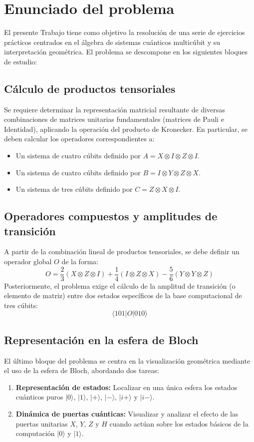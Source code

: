 \documentclass[11pt,a4paper,spanish]{book}
\begin{document}
\chapter{Enunciado del problema}

El presente Trabajo tiene como objetivo la resolución de una serie de ejercicios prácticos centrados en el álgebra de sistemas cuánticos multicúbit y su interpretación geométrica. El problema se descompone en los siguientes bloques de estudio:

\section{Cálculo de productos tensoriales}
Se requiere determinar la representación matricial resultante de diversas combinaciones de matrices unitarias fundamentales (matrices de Pauli e Identidad), aplicando la operación del producto de Kronecker. En particular, se deben calcular los operadores correspondientes a:
\begin{itemize}
    \item Un sistema de cuatro cúbits definido por $A = X \otimes I \otimes Z \otimes I$.
    \item Un sistema de cuatro cúbits definido por $B = I \otimes Y \otimes Z \otimes X$.
    \item Un sistema de tres cúbits definido por $C = Z \otimes X \otimes I$.
\end{itemize}

\section{Operadores compuestos y amplitudes de transición}
A partir de la combinación lineal de productos tensoriales, se debe definir un operador global $O$ de la forma:
\[ O = \frac{2}{3}(X \otimes Z \otimes I) + \frac{1}{4}(I \otimes Z \otimes X) - \frac{5}{6}(Y \otimes Y \otimes Z) \]
Posteriormente, el problema exige el cálculo de la amplitud de transición (o elemento de matriz) entre dos estados específicos de la base computacional de tres cúbits:
\[ \langle 101 | O | 010 \rangle \]

\section{Representación en la esfera de Bloch}
El último bloque del problema se centra en la visualización geométrica mediante el uso de la esfera de Bloch, abordando dos tareas:
\begin{enumerate}
    \item \textbf{Representación de estados:} Localizar en una única esfera los estados cuánticos puros $|0\rangle$, $|1\rangle$, $|+\rangle$, $|-\rangle$, $|i+\rangle$ y $|i-\rangle$.
    \item \textbf{Dinámica de puertas cuánticas:} Visualizar y analizar el efecto de las puertas unitarias $X$, $Y$, $Z$ y $H$ cuando actúan sobre los estados básicos de la computación $|0\rangle$ y $|1\rangle$.
\end{enumerate}
\end{document}
